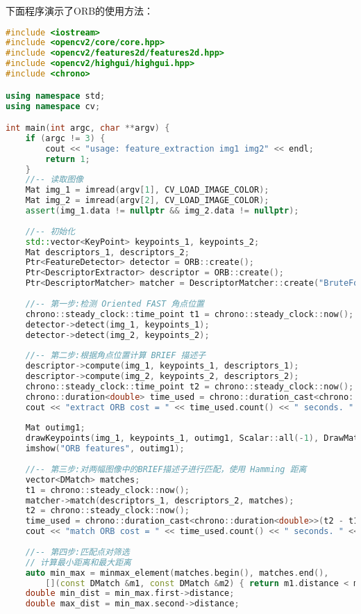下面程序演示了ORB的使用方法：
\begin{lstlisting}[language=c++,caption=slambook2/ch7/orb_cv.cpp]
#include <iostream>
#include <opencv2/core/core.hpp>
#include <opencv2/features2d/features2d.hpp>
#include <opencv2/highgui/highgui.hpp>
#include <chrono>

using namespace std;
using namespace cv;

int main(int argc, char **argv) {
    if (argc != 3) {
        cout << "usage: feature_extraction img1 img2" << endl;
        return 1;
    }
    //-- 读取图像
    Mat img_1 = imread(argv[1], CV_LOAD_IMAGE_COLOR);
    Mat img_2 = imread(argv[2], CV_LOAD_IMAGE_COLOR);
    assert(img_1.data != nullptr && img_2.data != nullptr);
    
    //-- 初始化
    std::vector<KeyPoint> keypoints_1, keypoints_2;
    Mat descriptors_1, descriptors_2;
    Ptr<FeatureDetector> detector = ORB::create();
    Ptr<DescriptorExtractor> descriptor = ORB::create();
    Ptr<DescriptorMatcher> matcher = DescriptorMatcher::create("BruteForce-Hamming");
    
    //-- 第一步:检测 Oriented FAST 角点位置
    chrono::steady_clock::time_point t1 = chrono::steady_clock::now();
    detector->detect(img_1, keypoints_1);
    detector->detect(img_2, keypoints_2);
    
    //-- 第二步:根据角点位置计算 BRIEF 描述子
    descriptor->compute(img_1, keypoints_1, descriptors_1);
    descriptor->compute(img_2, keypoints_2, descriptors_2);
    chrono::steady_clock::time_point t2 = chrono::steady_clock::now();
    chrono::duration<double> time_used = chrono::duration_cast<chrono::duration<double>>(t2 - t1);
    cout << "extract ORB cost = " << time_used.count() << " seconds. " << endl;
    
    Mat outimg1;
    drawKeypoints(img_1, keypoints_1, outimg1, Scalar::all(-1), DrawMatchesFlags::DEFAULT);
    imshow("ORB features", outimg1);
    
    //-- 第三步:对两幅图像中的BRIEF描述子进行匹配，使用 Hamming 距离
    vector<DMatch> matches;
    t1 = chrono::steady_clock::now();
    matcher->match(descriptors_1, descriptors_2, matches);
    t2 = chrono::steady_clock::now();
    time_used = chrono::duration_cast<chrono::duration<double>>(t2 - t1);
    cout << "match ORB cost = " << time_used.count() << " seconds. " << endl;
    
    //-- 第四步:匹配点对筛选
    // 计算最小距离和最大距离
    auto min_max = minmax_element(matches.begin(), matches.end(),
        [](const DMatch &m1, const DMatch &m2) { return m1.distance < m2.distance; });
    double min_dist = min_max.first->distance;
    double max_dist = min_max.second->distance;
    

\end{lstlisting}
